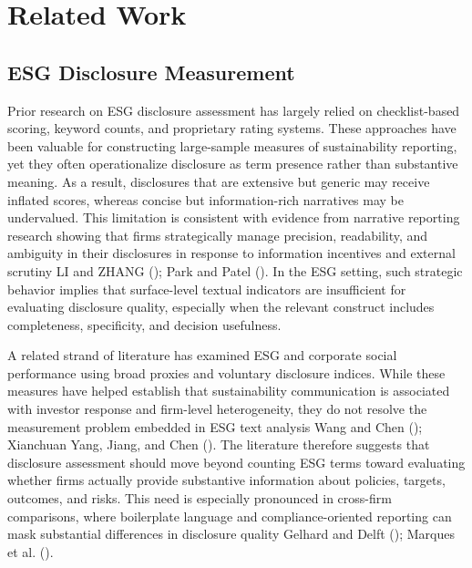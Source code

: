 \documentclass[
  12pt,
]{article}
\begin{document}
\section{Related Work}\label{related-work}

\subsection{ESG Disclosure
Measurement}\label{esg-disclosure-measurement}

Prior research on ESG disclosure assessment has largely relied on
checklist-based scoring, keyword counts, and proprietary rating systems.
These approaches have been valuable for constructing large-sample
measures of sustainability reporting, yet they often operationalize
disclosure as term presence rather than substantive meaning. As a
result, disclosures that are extensive but generic may receive inflated
scores, whereas concise but information-rich narratives may be
undervalued. This limitation is consistent with evidence from narrative
reporting research showing that firms strategically manage precision,
readability, and ambiguity in their disclosures in response to
information incentives and external scrutiny LI and ZHANG
(); Park and Patel
(). In the ESG setting, such strategic
behavior implies that surface-level textual indicators are insufficient
for evaluating disclosure quality, especially when the relevant
construct includes completeness, specificity, and decision usefulness.

A related strand of literature has examined ESG and corporate social
performance using broad proxies and voluntary disclosure indices. While
these measures have helped establish that sustainability communication
is associated with investor response and firm-level heterogeneity, they
do not resolve the measurement problem embedded in ESG text analysis
Wang and Chen (); Xianchuan Yang, Jiang,
and Chen (). The literature therefore
suggests that disclosure assessment should move beyond counting ESG
terms toward evaluating whether firms actually provide substantive
information about policies, targets, outcomes, and risks. This need is
especially pronounced in cross-firm comparisons, where boilerplate
language and compliance-oriented reporting can mask substantial
differences in disclosure quality Gelhard and Delft
(); Marques et al.
().
\end{document}
